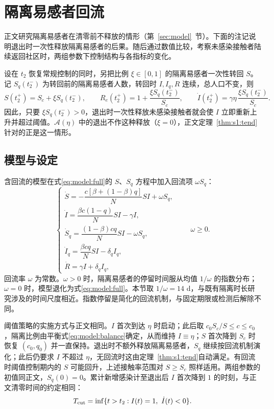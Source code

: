 \section{隔离易感者回流}
\label{sec:sup:return}
正文研究隔离易感者在清零前不释放的情形（第~\ref{sec:model}~节）。下面的注记说明退出时一次性释放隔离易感者的后果。随后通过数值比较，考察未感染接触者陆续返回社区时，两组参数下控制结构与各指标的变化。
\begin{remarkn}
\label{rem:release-at-exit}
设在 $t_2$ 恢复常规控制的同时，另把比例 $\xi\in[0,1]$ 的隔离易感者一次性转回 $S$。记 $S_q(t_2^-)$ 为转回前的隔离易感者人数，转回时 $I,I_q,R$ 连续，总人口不变，则
\[
S(t_2^+)=S_c+\xi S_q(t_2^-),\qquad
R_e(t_2^+)=1+\frac{\xi S_q(t_2^-)}{S_c},\qquad
\dot I(t_2^+)=\gamma\eta\,\frac{\xi S_q(t_2^-)}{S_c}.
\]
因此，只要 $\xi S_q(t_2^-)>0$，退出时一次性释放未感染接触者就会使 $I$ 立即重新上升并超过阈值。$\mathcal A(\eta)$ 中的退出不作这种释放（$\xi=0$），正文定理~\ref{thm:s1:tend}针对的正是这一情形。
\end{remarkn}

\subsection{模型与设定}
含回流的模型在式\eqref{eq:model:full}的 $S$、$S_q$ 方程中加入回流项 $\omega S_q$：
\begin{equation}
\begin{cases}
\dot S=-\dfrac{c[\beta+(1-\beta)q]}{N}SI+\omega S_q,\\[.5em]
\dot I=\dfrac{\beta c(1-q)}{N}SI-\gamma I,\\[.5em]
\dot S_q=\dfrac{(1-\beta)cq}{N}SI-\omega S_q,\\[.5em]
\dot I_q=\dfrac{\beta cq}{N}SI-\delta_q I_q,\\[.5em]
\dot R=\gamma I+\delta_q I_q,
\end{cases}
\qquad\omega\ge0.
\label{eq:return:model}
\end{equation}
回流率 $\omega$ 为常数。$\omega>0$ 时，隔离易感者的停留时间服从均值 $1/\omega$ 的指数分布；$\omega=0$ 时，模型退化为式\eqref{eq:model:full}。本节取 $1/\omega=14$ d，与既有隔离时长研究涉及的时间尺度相近\cite{Ashcroft2021,Wells2021}。指数停留是简化的回流机制，与固定期限或检测后解除不同。

阈值策略的实施方式与正文相同。$I$ 首次到达 $\eta$ 时启动；此后取 $c_0S_c/S\le c\le c_0$，隔离比例由平衡式\eqref{eq:model:balance}确定，从而维持 $I\equiv\eta$；$S$ 首次降到 $S_c$ 时恢复 $(c_0,q_0)$ 并一直保持。退出时不额外释放隔离易感者，$S_q$ 继续按回流机制演化；此后仍要求 $I$ 不超过 $\eta$，无回流时这由定理~\ref{thm:s1:tend}自动满足。有回流时阈值控制期内的 $S$ 可能回升，上述接触率范围对 $S\ge S_c$ 照样适用。两组参数的初值同正文，$S_q(0)=0$。累计新增感染计至退出后 $I$ 首次降到 $1$ 的时刻，与正文清零时间的约定相同：
\begin{equation}
T_{\rm cut}=\inf\{t>t_2:I(t)=1,\ \dot I(t)<0\}.
\label{eq:return:cut}
\end{equation}

